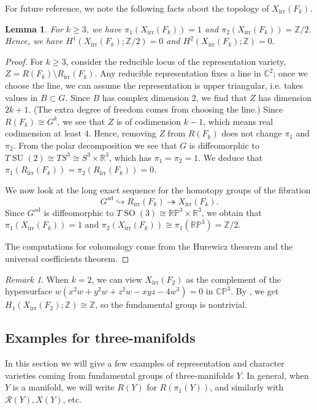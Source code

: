 \documentclass [11pt]{amsart}
\newtheorem {lemma}[theorem]{Lemma}
\theoremstyle{remark}
\newtheorem {remark}[theorem]{Remark}
\def\zz {{\mathbb{Z}}}
\def\rr {{\mathbb{R}}}
\def\cc {{\mathbb{C}}}
\def\C{\cc}
\def\R{\rr}
\def\Z {\zz}
\def\rp {\mathbb{RP}}
\def\Gad{G^{\operatorname{ad}}}
\def\su {{\operatorname{SU}(2)}}
\def\Rep {R}
\def\RepIrr{R_{\operatorname{irr}}}
\def\Rs {\mathscr{R}}
\def\Char {X}
\def\CharIrr {\Char_{\operatorname{irr}}}
\begin{document}
For future reference, we note the following facts about the topology of $\CharIrr(F_k)$.
\begin{lemma}
\label{lem:pifree}
For $k \geq 3$, we have $\pi_1(\CharIrr(F_k)) = 1$ and $\pi_2(\CharIrr(F_k))=\Z/2$. Hence, we have $H^1(\CharIrr(F_k); \Z/2) =0$ and  $H^2(\CharIrr(F_k); \Z) =0.$
\end{lemma}

\begin{proof}
For $k\geq 3$, consider the reducible locus of the representation variety, $Z = \Rep(F_k) \setminus \RepIrr(F_k)$. Any reducible representation fixes a line in $\C^2$; once we choose the line, we can assume the representation is upper triangular, i.e. takes values in $B \subset G$. Since $B$ has complex dimension $2$, we find that $Z$ has dimension $2k+1$. (The extra degree of freedom comes from choosing the line.) Since $\Rep(F_k) \cong G^k$, we see that $Z$ is of codimension $k-1$, which means real codimension at least $4$. Hence, removing $Z$ from $\Rep(F_k)$ does not change $\pi_1$ and $\pi_2$. From the polar decomposition we see that $G$ is diffeomorphic to $T\su \cong TS^3 \cong S^3 \times \R^3$, which has $\pi_1 = \pi_2 = 1$. We deduce that $\pi_1(\RepIrr(F_k)) =  \pi_2(\RepIrr(F_k))=0$.

We now look at the long exact sequence for the homotopy groups of the fibration $$\Gad \hookrightarrow \RepIrr(F_k) \twoheadrightarrow \CharIrr(F_k).$$
Since $\Gad$ is diffeomorphic to $T\operatorname{SO}(3) \cong \rp^3 \times \R^3$, we obtain that $\pi_1(\CharIrr(F_k)) = 1$ and $\pi_2(\CharIrr(F_k))\cong \pi_1(\rp^3) = \Z/2$.

The computations for cohomology come from the Hurewicz theorem and the universal coefficients theorem.
\end{proof}

\begin{remark}
\label{rem:doi}
When $k = 2$, we can view $\CharIrr(F_2)$ as the complement of the hypersurface $w( x^2w + y^2w + z^2w - xyz-4w^3)=0$ in $\mathbb{CP}^3$. By \cite[Ch.4, Proposition 1.3]{DimcaSing}, we get $H_1(\CharIrr(F_2); \Z) \cong \Z$, so the fundamental group is nontrivial.
\end{remark}



\subsection{Examples for three-manifolds}
\label{sec:ex3}
In this section we will give a few examples of representation and character varieties coming from fundamental groups of three-manifolds $Y$. In general, when $Y$ is a manifold, we will write $\Rep(Y)$ for $\Rep(\pi_1(Y))$, and similarly with $\Rs(Y), \Char(Y)$, etc. 
\end{document}
